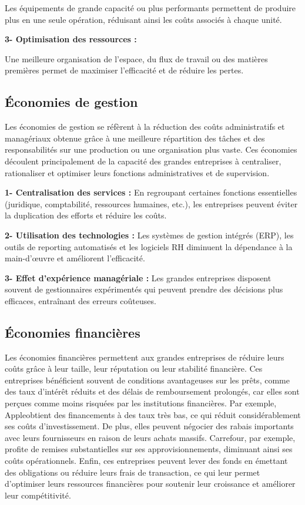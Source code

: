 Les équipements de grande capacité ou plus performants permettent de produire
plus en une seule opération, réduisant ainsi les coûts associés à chaque unité.
\par
\textbf{3- Optimisation des ressources :}

Une meilleure organisation de l’espace, du flux de travail ou des matières
premières permet de maximiser l’efficacité et de réduire les pertes.

\subsection{Économies de gestion}
Les économies de gestion se réfèrent à la réduction des coûts administratifs et
managériaux obtenue grâce à une meilleure répartition des tâches et des
responsabilités sur une production ou une organisation plus vaste. Ces
économies découlent principalement de la capacité des grandes entreprises à
centraliser, rationaliser et optimiser leurs fonctions administratives et de
supervision.

\par
\textbf{1- Centralisation des services :}
En regroupant certaines fonctions essentielles (juridique, comptabilité, ressources humaines, etc.), les entreprises peuvent
éviter la duplication des efforts
et réduire les coûts.
\par
\textbf{2- Utilisation des technologies :}
Les systèmes de gestion intégrés (ERP), les outils de reporting automatisés et les logiciels RH diminuent la dépendance
à la main-d'œuvre et améliorent l'efficacité.
\par
\textbf{3- Effet d'expérience managériale :}
Les grandes entreprises disposent souvent de gestionnaires expérimentés qui peuvent prendre des décisions plus efficaces,
entraînant des erreurs coûteuses.
\subsection{Économies financières}
Les économies financières permettent aux grandes entreprises de réduire leurs
coûts grâce à leur taille, leur réputation ou leur stabilité financière. Ces
entreprises bénéficient souvent de conditions avantageuses sur les prêts, comme
des taux d'intérêt réduits et des délais de remboursement prolongés, car elles
sont perçues comme moins risquées par les institutions financières. Par
exemple, Appleobtient des financements à des taux très bas, ce qui réduit
considérablement ses coûts d'investissement. De plus, elles peuvent négocier
des rabais importants avec leurs fournisseurs en raison de leurs achats
massifs. Carrefour, par exemple, profite de remises substantielles sur ses
approvisionnements, diminuant ainsi ses coûts opérationnels. Enfin, ces
entreprises peuvent lever des fonds en émettant des obligations ou réduire
leurs frais de transaction, ce qui leur permet d'optimiser leurs ressources
financières pour soutenir leur croissance et améliorer leur compétitivité.
